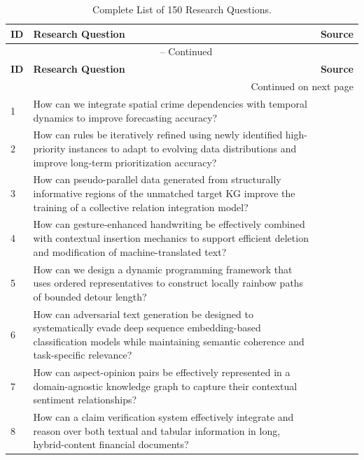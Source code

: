 \footnotesize
\begin{longtable}{@{}p{0.5cm}p{7.2cm}p{2.5cm}@{}}
\caption{Complete List of 150 Research Questions.} \\
\toprule
\textbf{ID} & \textbf{Research Question} & \textbf{Source} \\
\midrule
\endfirsthead
\multicolumn{3}{c}{\tablename\ \thetable{} -- Continued} \\
\toprule
\textbf{ID} & \textbf{Research Question} & \textbf{Source} \\
\midrule
\endhead
\midrule
\multicolumn{3}{r}{Continued on next page} \\
\endfoot
\bottomrule
\endlastfoot

1 & How can we integrate spatial crime dependencies with temporal dynamics to improve forecasting accuracy? & \cite{10.1609/aaai.v36i4.20338} \\
2 & How can rules be iteratively refined using newly identified high-priority instances to adapt to evolving data distributions and improve long-term prioritization accuracy? & \cite{10.1609/aaai.v33i01.33019440} \\
3 & How can pseudo-parallel data generated from structurally informative regions of the unmatched target KG improve the training of a collective relation integration model? & \cite{10.18653/v1/2021.acl-long.363} \\
4 & How can gesture-enhanced handwriting be effectively combined with contextual insertion mechanics to support efficient deletion and modification of machine-translated text? & \cite{10.18653/v1/2020.acl-main.155} \\
5 & How can we design a dynamic programming framework that uses ordered representatives to construct locally rainbow paths of bounded detour length? & \cite{10.1609/aaai.v38i8.28639} \\
6 & How can adversarial text generation be designed to systematically evade deep sequence embedding-based classification models while maintaining semantic coherence and task-specific relevance? & \cite{10.1609/aaai.v37i13.26811} \\
7 & How can aspect-opinion pairs be effectively represented in a domain-agnostic knowledge graph to capture their contextual sentiment relationships? & \cite{10.1609/aaai.v36i11.21653} \\
8 & How can a claim verification system effectively integrate and reason over both textual and tabular information in long, hybrid-content financial documents? & \cite{10.18653/v1/2024.emnlp-main.818} \\

\end{longtable}

